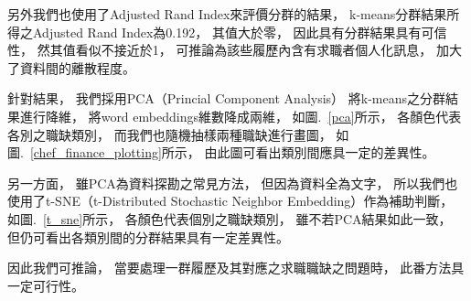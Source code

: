 \documentclass[sigconf]{acmart}
\begin{document}
另外我們也使用了Adjusted Rand Index來評價分群的結果\cite{hubert1985comparing}，
k-means分群結果所得之Adjusted Rand Index為0.192，
其值大於零，
因此具有分群結果具有可信性，
然其值看似不接近於1，
可推論為該些履歷內含有求職者個人化訊息，
加大了資料間的離散程度。

針對結果，
我們採用PCA（Princial Component Analysis）\cite{pearson1901liii} \cite{han2011data}將k-means之分群結果進行降維，
將word embeddings維數降成兩維，
如圖.~\ref{pca}所示，
各顏色代表各別之職缺類別，
而我們也隨機抽樣兩種職缺進行畫圖，
如圖.~\ref{chef_finance_plotting}所示，
由此圖可看出類別間應具一定的差異性。


另一方面，
雖PCA為資料探勘之常見方法，
但因為資料全為文字，
所以我們也使用了t-SNE（t-Distributed Stochastic Neighbor Embedding）\cite{van2008visualizing}作為補助判斷，
如圖.~\ref{t_sne}所示，
各顏色代表個別之職缺類別，
雖不若PCA結果如此一致，
但仍可看出各類別間的分群結果具有一定差異性。

因此我們可推論，
當要處理一群履歷及其對應之求職職缺之問題時，
此番方法具一定可行性。
\end{document}
